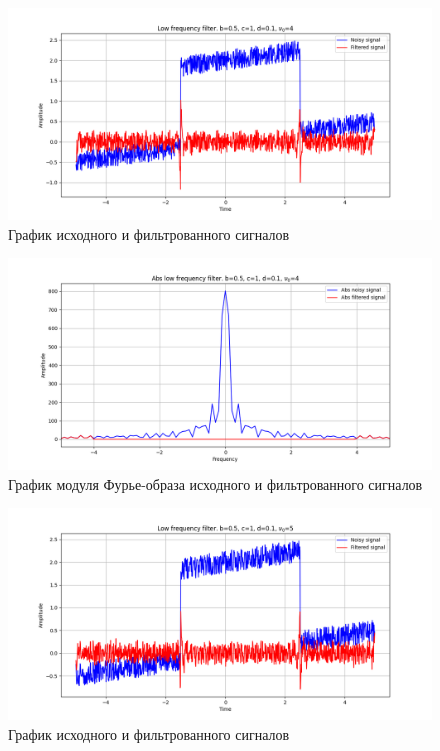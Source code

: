 \documentclass[a4paper, 12pt]{article}
\begin{document}
    \begin{figure}[!htb]
        \centering
        \includegraphics[scale=0.485]{13_u_flt_u_nolow.png}
        \captionsetup{skip=0pt}
        \caption{График исходного и фильтрованного сигналов}
        \label{fig:fig51}
    \end{figure}
    \begin{figure}[!htb]
        \centering
        \includegraphics[scale=0.485]{13_abs_u_U_nolow.png}
        \captionsetup{skip=0pt}
        \caption{График модуля Фурье-образа исходного и фильтрованного сигналов}
        \label{fig:fig52}
    \end{figure}
    \begin{figure}[!htb]
        \centering
        \includegraphics[scale=0.485]{14_u_flt_u_nolow.png}
        \captionsetup{skip=0pt}
        \caption{График исходного и фильтрованного сигналов}
        \label{fig:fig53}
    \end{figure}
\end{document}
